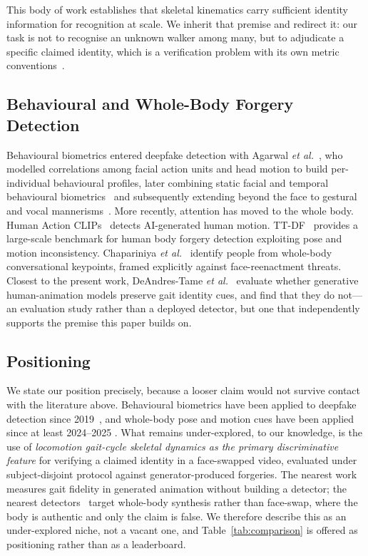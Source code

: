 \documentclass[journal]{IEEEtran}
\begin{document}
This body of work establishes that skeletal kinematics carry sufficient
identity information for recognition at scale. We inherit that premise and
redirect it: our task is not to recognise an unknown walker among many, but to
adjudicate a specific claimed identity, which is a verification problem with
its own metric conventions~\cite{iso19795}.

\subsection{Behavioural and Whole-Body Forgery Detection}

Behavioural biometrics entered deepfake detection with Agarwal
\emph{et al.}~\cite{agarwal2019}, who modelled correlations among facial action
units and head motion to build per-individual behavioural profiles, later
combining static facial and temporal behavioural
biometrics~\cite{agarwal2020} and subsequently extending beyond the face to
gestural and vocal mannerisms~\cite{agarwal_pnas}. More recently, attention has
moved to the whole body. Human Action CLIPs~\cite{humanactionclips} detects
AI-generated human motion. TT-DF~\cite{ttdf} provides a large-scale benchmark
for human body forgery detection exploiting pose and motion inconsistency.
Chapariniya \emph{et al.}~\cite{convkeypoints} identify people from
whole-body conversational keypoints, framed explicitly against face-reenactment
threats. Closest to the present work, DeAndres-Tame
\emph{et al.}~\cite{gaitfidelity} evaluate whether generative human-animation
models preserve gait identity cues, and find that they do not---an evaluation
study rather than a deployed detector, but one that independently supports the
premise this paper builds on.

\subsection{Positioning}

We state our position precisely, because a looser claim would not survive
contact with the literature above. Behavioural biometrics have been applied to
deepfake detection since 2019~\cite{agarwal2019}, and whole-body pose and
motion cues have been applied since at least 2024--2025
\cite{humanactionclips,ttdf,convkeypoints}. What remains under-explored, to our
knowledge, is the use of \emph{locomotion gait-cycle skeletal dynamics as the
primary discriminative feature} for verifying a claimed identity in a
face-swapped video, evaluated under subject-disjoint protocol against
generator-produced forgeries. The nearest work~\cite{gaitfidelity} measures
gait fidelity in generated animation without building a detector; the nearest
detectors~\cite{ttdf,humanactionclips} target whole-body synthesis rather than
face-swap, where the body is authentic and only the claim is false. We
therefore describe this as an under-explored niche, not a vacant one, and
Table~\ref{tab:comparison} is offered as positioning rather than as a
leaderboard.
\end{document}
